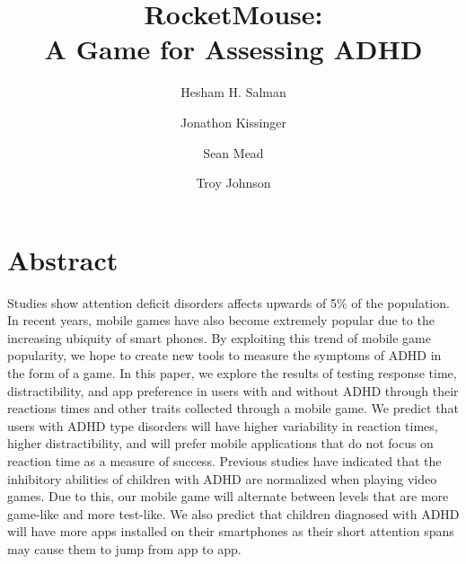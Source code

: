 \documentclass[a4wide]{article}
\title{RocketMouse:\\ A Game for Assessing ADHD}
\author{Hesham H. Salman \and Jonathon Kissinger \and Sean Mead \and Troy Johnson}
\begin{document}
\maketitle


\section{Abstract}
\- Studies show attention deficit disorders affects upwards of 5\% of the population. In recent years, mobile games have also become extremely popular due to the increasing ubiquity of smart phones. By exploiting this trend of mobile game popularity, we hope to create new tools to measure the symptoms of ADHD in the form of a game. In this paper, we explore the results of testing response time, distractibility, and app preference in users with and without ADHD through their reactions times and other traits collected through a mobile game.  We predict that users with ADHD type disorders will have higher variability in reaction times, higher distractibility, and will prefer mobile applications that do not focus on reaction time as a measure of success. Previous studies have indicated that the inhibitory abilities of children with ADHD are normalized when playing video games. Due to this, our mobile game will alternate between levels that are more game-like and more test-like. We also predict that children diagnosed with ADHD will have more apps installed on their smartphones as their short attention spans may cause them to jump from app to app.
\end{document}
